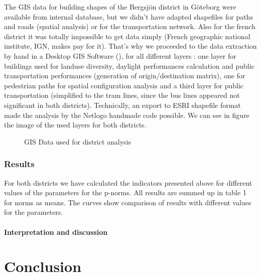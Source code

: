 \documentclass[english]{article}
\begin{document}
The GIS data for building shapes of the Bergsjön district in Göteborg
were available from internal database, but we didn't have adapted
shapefiles for paths and roads (spatial analysis) or for the transportation
network. Also for the french district it was totally impossible to
get data simply (French geographic national institute, IGN, makes
pay for it). That's why we proceeded to the data extraction by hand
in a Desktop GIS Software (\cite{QGIS_software}), for all different
layers : one layer for buildings used for landuse diversity, daylight
performances calculation and public transportation performances (generation
of origin/destination matrix), one for pedestrian paths for spatial
configuration analysis and a third layer for public transportation
(simplified to the tram lines, since the bus lines appeared not significant
in both districts). Technically, an export to ESRI shapefile format
made the analysis by the Netlogo handmade code possible. We can see
in figure  the image of the used layers for both districts.

\begin{figure}


\caption{GIS Data used for district analysis}


\end{figure}



\subsubsection{Results}

For both districts we have calculated the indicators presented above
for different values of the parameters for the p-norms. All results
are summed up in table 1 for norms as means. The curves show comparison
of results with different values for the parameters.


\paragraph{Interpretation and discussion}


\section*{Conclusion}

\newpage{}



\end{document}
